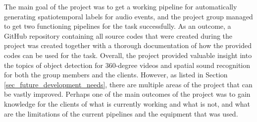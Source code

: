 The main goal of the project was to get a working pipeline for automatically generating spatiotemporal labels for audio events, and the project group managed to get two functioning pipelines for the task successfully. As an outcome, a GitHub repository containing all source codes that were created during the project was created together with a thorough documentation of how the provided codes can be used for the task. Overall, the project provided valuable insight into the topics of object detection for 360-degree videos and spatial sound recognition for both the group members and the clients. However, as listed in Section \ref{sec_future_development_needs}, there are multiple areas of the project that can be vastly improved. Perhaps one of the main outcomes of the project was to gain knowledge for the clients of what is currently working and what is not, and what are the limitations of the current pipelines and the equipment that was used.